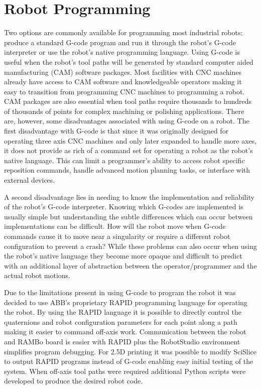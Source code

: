 \documentclass[main.tex]{subfiles}
\begin{document}
\chapter{Robot Programming}
Two options are commonly available for programming most industrial robots: produce a standard G-code program and run it through the robot's G-code interpreter or use the robot's native programming language.
Using G-code is useful when the robot's tool paths will be generated by standard computer aided manufacturing (CAM) software packages.
Most facilities with CNC machines already have access to CAM software and knowledgeable operators making it easy to transition from programming CNC machines to programming a robot.
CAM packages are also essential when tool paths require thousands to hundreds of thousands of points for complex machining or polishing applications.
There are, however, some disadvantages associated with using G-code on a robot.
The first disadvantage with G-code is that since it was originally designed for operating three axis CNC machines and only later expanded to handle more axes, it does not provide as rich of a command set for operating a robot as the robot's native language.
This can limit a programmer's ability to access robot specific reposition commands, handle advanced motion planning tasks, or interface with external devices.

A second disadvantage lies in needing to know the implementation and reliability of the robot's G-code interpreter.
Knowing which G-codes are implemented is usually simple but understanding the subtle differences which can occur between implementations can be difficult.
How will the robot move when G-code commands cause it to move near a singularity or require a different robot configuration to prevent a crash?
While these problems can also occur when using the robot's native language they become more opaque and difficult to predict with an additional layer of abstraction between the operator/programmer and the actual robot motions.

Due to the limitations present in using G-code to program the robot it was decided to use ABB's proprietary RAPID programming language for operating the robot.
By using the RAPID language it is possible to directly control the quaternions and robot configuration parameters for each point along a path making it easier to command off-axis work.
Communication between the robot and RAMBo board is easier with RAPID plus the RobotStudio environment simplifies program debugging.
For 2.5D printing it was possible to modify SciSlice to output RAPID programs instead of G-code enabling easy initial testing of the system.
When off-axis tool paths were required additional Python scripts were developed to produce the desired robot code.
\end{document}

